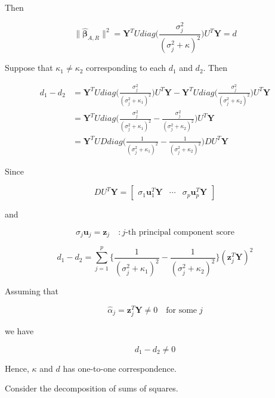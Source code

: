\documentclass[]{book}
\theoremstyle{definition}
\theoremstyle{definition}
\theoremstyle{definition}
\theoremstyle{remark}
\begin{document}
Then

\begin{equation}
  \lVert \boldsymbol{\hat\beta}_{A, R} \rVert^2 = \mathbf{Y}^T U diag\bigg( \frac{\sigma_j^2}{(\sigma_j^2 + \kappa)^2} \bigg) U^T \mathbf{Y} = d
  \label{eq:dvskappa}
\end{equation}

Suppose that \(\kappa_1 \neq \kappa_2\) corresponding to each \(d_1\) and \(d_2\). Then

\begin{equation*}
  \begin{split}
    d_1 - d_2 & = \mathbf{Y}^T U diag\bigg( \frac{\sigma_j^2}{(\sigma_j^2 + \kappa_1)^2} \bigg) U^T \mathbf{Y} - \mathbf{Y}^T U diag\bigg( \frac{\sigma_j^2}{(\sigma_j^2 + \kappa_2)^2} \bigg) U^T \mathbf{Y} \\
    & = \mathbf{Y}^T U diag\bigg( \frac{\sigma_j^2}{(\sigma_j^2 + \kappa_1)^2} - \frac{\sigma_j^2}{(\sigma_j^2 + \kappa_2)^2} \bigg) U^T \mathbf{Y} \\
    & = \mathbf{Y}^T UD diag\bigg( \frac{1}{(\sigma_j^2 + \kappa_1)^2} - \frac{1}{(\sigma_j^2 + \kappa_2)^2} \bigg) D U^T \mathbf{Y}
  \end{split}
\end{equation*}

Since

\[DU^T \mathbf{Y} = \begin{bmatrix} \sigma_1 \mathbf{u}_1^T \mathbf{Y} & \cdots & \sigma_p \mathbf{u}_p^T \mathbf{Y} \end{bmatrix}\]

and

\[\sigma_j \mathbf{u}_j = \mathbf{z}_j \quad : j\text{-th principal component score}\]

\[d_1 - d_2 = \sum_{j = 1}^p \bigg\{ \frac{1}{(\sigma_j^2 + \kappa_1)^2} - \frac{1}{(\sigma_j^2 + \kappa_2)^2} \bigg\} (\mathbf{z}_j^T \mathbf{Y})^2\]

Assuming that

\[\hat\alpha_j = \mathbf{z}_j^T \mathbf{Y} \neq 0 \quad \text{for some} \; j\]

we have

\[d_1 - d_2 \neq 0\]

Hence, \(\kappa\) and \(d\) has one-to-one correspondence.

Consider the decomposition of sums of squares.
\end{document}
